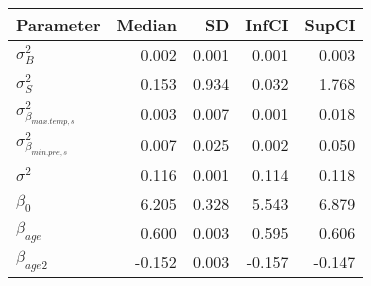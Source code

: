 \begin{table}[ht]
\centering
\begin{tabular}{lrrrr}
  \hline
Parameter & Median & SD & InfCI & SupCI \\ 
  \hline
$\sigma^{2}_{B}$ & 0.002 & 0.001 & 0.001 & 0.003 \\ 
  $\sigma^{2}_{S}$ & 0.153 & 0.934 & 0.032 & 1.768 \\ 
  $\sigma^{2}_{\beta_{max.temp,s}}$ & 0.003 & 0.007 & 0.001 & 0.018 \\ 
  $\sigma^{2}_{\beta_{min.pre,s}}$ & 0.007 & 0.025 & 0.002 & 0.050 \\ 
  $\sigma^{2}$ & 0.116 & 0.001 & 0.114 & 0.118 \\ 
  $\beta_{0}$ & 6.205 & 0.328 & 5.543 & 6.879 \\ 
  $\beta_{age}$ & 0.600 & 0.003 & 0.595 & 0.606 \\ 
  $\beta_{age2}$ & -0.152 & 0.003 & -0.157 & -0.147 \\ 
   \hline
\end{tabular}
\end{table}
